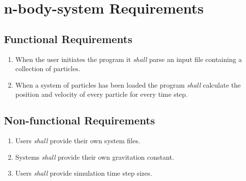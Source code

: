 \documentclass[12pt]{article}
\begin{document}
\section*{n-body-system Requirements}
	\subsection*{Functional Requirements}
		\begin{enumerate}[label=FR-\arabic*]
			\item \label{FR.Initiate} When the user initiates the program it {\em shall} parse an input file containing a collection of particles.
			\item \label{FR.Calculate} When a system of particles has been loaded the program {\em shall} calculate the position and velocity of every particle for every time step.
		\end{enumerate}
	\subsection*{Non-functional Requirements}
		\begin{enumerate}[label=NR-\arabic*]
			\item \label{NF.UsersProvideFile} Users {\em shall} provide their own system files. 
			\item \label{NF.SystemsProvideG} Systems {\em shall} provide their own gravitation constant. 
			\item Users \label{NF.UsersProvideTime} {\em shall} provide simulation time step sizes. 
		\end{enumerate}
\end{document}
